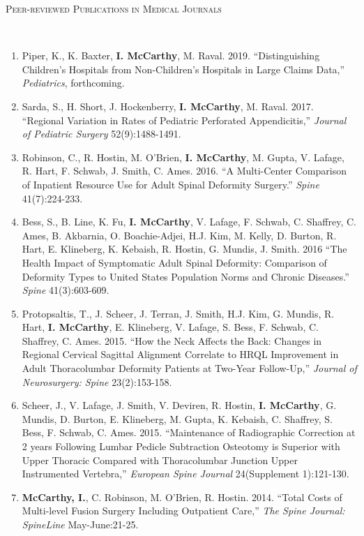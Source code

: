 \documentclass[9pt]{article}
\newenvironment{changemargin}[2]{%
  \begin{list}{}{%
    \setlength{\topsep}{0pt}%
    \setlength{\leftmargin}{#1}%
    \setlength{\rightmargin}{#2}%
    \setlength{\listparindent}{\parindent}%
    \setlength{\itemindent}{\parindent}%
    \setlength{\parsep}{\parskip}%
  }%
  \item[]}{\end{list}
}
\newcommand{\lineover}{
	\begin{changemargin}{-0.05in}{-0.05in}
		\vspace*{-8pt}
		\hrulefill \\
		\vspace*{-2pt}
	\end{changemargin}
}
\newcommand{\header}[1]{
	\begin{changemargin}{-0.5in}{-0.5in}
		\scshape{#1}\\
  	\lineover
	\end{changemargin}
}
\newenvironment{body} {
	\vspace*{-16pt}
	\begin{changemargin}{-0.25in}{-0.5in}
  }	
	{\end{changemargin}
}
\begin{document}
\header{Peer-reviewed Publications in Medical Journals}
\begin{body}
  \vspace{14pt}
  \begin{enumerate}
    \item Piper, K., K. Baxter, \textbf{I. McCarthy}, M. Raval. 2019. ``Distinguishing Children's Hospitals from Non-Children's Hospitals in Large Claims Data,'' \textit{Pediatrics}, forthcoming.
    \item Sarda, S., H. Short, J. Hockenberry, \textbf{I. McCarthy}, M. Raval. 2017. ``Regional Variation in Rates of Pediatric Perforated Appendicitis,'' \textit{Journal of Pediatric Surgery} 52(9):1488-1491.
    \item Robinson, C., R. Hostin, M. O'Brien, \textbf{I. McCarthy}, M. Gupta, V. Lafage, R. Hart, F. Schwab, J. Smith, C. Ames. 2016. ``A Multi-Center Comparison of Inpatient Resource Use for Adult Spinal Deformity Surgery.'' \textit{Spine} 41(7):224-233.
    \item Bess, S., B. Line, K. Fu, \textbf{I. McCarthy}, V. Lafage, F. Schwab, C. Shaffrey, C. Ames, B. Akbarnia, O. Boachie-Adjei, H.J. Kim, M. Kelly, D. Burton, R. Hart, E. Klineberg, K. Kebaish, R. Hostin, G. Mundis, J. Smith. 2016 ``The Health Impact of Symptomatic Adult Spinal Deformity: Comparison of Deformity Types to United States Population Norms and Chronic Diseases.'' \textit{Spine} 41(3):603-609.
    \item Protopsaltis, T., J. Scheer, J. Terran, J. Smith, H.J. Kim, G. Mundis, R. Hart, \textbf{I. McCarthy}, E. Klineberg, V. Lafage, S. Bess, F. Schwab, C. Shaffrey, C. Ames. 2015. ``How the Neck Affects the Back: Changes in Regional Cervical Sagittal Alignment Correlate to HRQL Improvement in Adult Thoracolumbar Deformity Patients at Two-Year Follow-Up,'' \textit{Journal of Neurosurgery: Spine} 23(2):153-158.
    \item Scheer, J., V. Lafage, J. Smith, V. Deviren, R. Hostin, \textbf{I. McCarthy}, G. Mundis, D. Burton, E. Klineberg, M. Gupta, K. Kebaish, C. Shaffrey, S. Bess, F. Schwab, C. Ames. 2015. ``Maintenance of Radiographic Correction at 2 years Following Lumbar Pedicle Subtraction Osteotomy is Superior with Upper Thoracic Compared with Thoracolumbar Junction Upper Instrumented Vertebra,'' \textit{European Spine Journal} 24(Supplement 1):121-130.
    \item \textbf{McCarthy, I.}, C. Robinson, M. O'Brien, R. Hostin. 2014. ``Total Costs of Multi-level Fusion Surgery Including Outpatient Care,'' \textit{The Spine Journal: SpineLine} May-June:21-25.

\end{enumerate}
\end{body}
\end{document}
